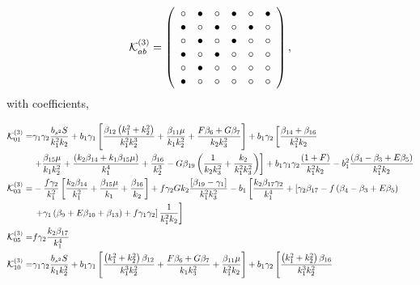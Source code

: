 \begin{equation}
\mathcal{K}^{(3)}_{ab}= 
 \left( \begin {array}{cccccc} \circ &\bullet &\circ &\bullet 
&\circ &\bullet \\  \bullet &\circ &
\bullet &\circ &\bullet &\circ \\  \circ &
\bullet &\circ &\bullet &\circ &\circ \\  
\bullet &\circ &\bullet &\circ &\circ &\circ 
\\  \circ &\bullet &\circ &\circ &\circ &
\circ \\  \bullet &\circ &\circ &\circ &
\circ &\circ \end {array} \right), 
\end{equation}
with coefficients,

\begin{align*}
\ko_{01}^{(3)}=& \gamma_1 \gamma_2 \frac{b_{s^2} S}{k_1^2 k_2} + b_1 \gamma_1 \left[\frac{\beta_{12}\left(k_1^2 + k_2^2\right)}{k_1^2 k_2^3} + \frac{\beta_{11} \mu}{k_1 k_2^2} + \frac{F \beta_{6} + G \beta_{7}}{k_2 k_3^2} \right] + b_1 \gamma_2 \left[ \frac{\beta_{14} + \beta_{16}}{k_1^2 k_2} \right. \\
&\left. + \frac{\beta_{15}\mu}{k_1 k_2^2} + \frac{\left(k_2 \beta_{14} + k_1 \beta_{15} \mu\right)}{k_1^4} + \frac{\beta_{16}}{k_2^3} - G \beta_{19} \left( \frac{1}{k_2 k_3^2} + \frac{k_2}{k_1^2 k_3^2}\right)\right] + b_1 \gamma_1 \gamma_2 \frac{\left(1+F\right)}{k_1^2 k_2} - b_1^2 \frac{\left({\beta_{4}-\beta_{3}} + E \beta_{5}\right)}{k_1^2 k_2}\\
\ko_{03}^{(3)}=& - \frac{f \gamma_2}{k_1^2} \left[ \frac{k_2 \beta_{14}}{k_1^2} + \frac{\beta_{15}\mu}{k_1} + \frac{\beta_{16}}{k_2} \right] + f \gamma_2 G k_2 \frac{\left[ \beta_{19} - \gamma_1 \right]}{k_1^2 k_3^2} - b_1 \left[ \frac{k_2 \beta_{17} \gamma_2}{k_1^4}  + \left[ \gamma_2 \beta_{17} - f \left( {\beta_{4}-\beta_{3}} + E \beta_{5}\right) \right. \right. \\
&\left. \left. + \gamma_1 \left( \beta_{9} + E \beta_{10} + \beta_{13} \right) + f \gamma_1 \gamma_2 \right] \frac{1}{k_1^2 k_2}\right]\\
\ko_{05}^{(3)}=&  f \gamma_2 \frac{k_2 \beta_{17}}{k_1^4} \\
\ko_{10}^{(3)}=& \gamma_1 \gamma_2 \frac{b_{s^2} S}{k_1 k_2^2} + b_1 \gamma_1 \left[ \frac{\left(k_1^2 + k_2^2\right)\beta_{12}}{k_1^3 k_2^2} + \frac{F \beta_{6} + G \beta_{7}}{k_1 k_3^2} + \frac{\beta_{11}\mu}{k_1^2 k_2}  \right] + b_1 \gamma_2 \left[ \frac{\left(k_1^2 + k_2^2\right) \beta_{16}}{k_1^3 k_2^2} \right. \\

\end{align*}
